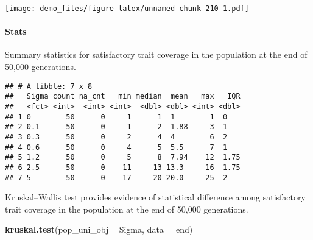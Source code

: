 \documentclass[]{book}
\newenvironment{Shaded}{\begin{snugshade}}{\end{snugshade}}
\newcommand{\DataTypeTok}[1]{\textcolor[rgb]{0.13,0.29,0.53}{#1}}
\newcommand{\KeywordTok}[1]{\textcolor[rgb]{0.13,0.29,0.53}{\textbf{#1}}}
\newcommand{\NormalTok}[1]{#1}
\newcommand{\OperatorTok}[1]{\textcolor[rgb]{0.81,0.36,0.00}{\textbf{#1}}}
\newcommand{\OtherTok}[1]{\textcolor[rgb]{0.56,0.35,0.01}{#1}}
\newcommand{\StringTok}[1]{\textcolor[rgb]{0.31,0.60,0.02}{#1}}
\let\oldparagraph\paragraph
\renewcommand{\paragraph}[1]{\oldparagraph{#1}\mbox{}}
\begin{document}
\texttt{[image: demo\_files/figure-latex/unnamed-chunk-210-1.pdf]}

\hypertarget{stats-40}{%
\paragraph{Stats}\label{stats-40}}

Summary statistics for satisfactory trait coverage in the population at the end of 50,000 generations.

\begin{Shaded}
\end{Shaded}

\begin{verbatim}
## # A tibble: 7 x 8
##   Sigma count na_cnt   min median  mean   max   IQR
##   <fct> <int>  <int> <int>  <dbl> <dbl> <int> <dbl>
## 1 0        50      0     1      1  1        1  0   
## 2 0.1      50      0     1      2  1.88     3  1   
## 3 0.3      50      0     2      4  4        6  2   
## 4 0.6      50      0     4      5  5.5      7  1   
## 5 1.2      50      0     5      8  7.94    12  1.75
## 6 2.5      50      0    11     13 13.3     16  1.75
## 7 5        50      0    17     20 20.0     25  2
\end{verbatim}

Kruskal--Wallis test provides evidence of statistical difference among satisfactory trait coverage in the population at the end of 50,000 generations.

\begin{Shaded}
\begin{Highlighting}[]
\KeywordTok{kruskal.test}\NormalTok{(pop_uni_obj }\OperatorTok{~}\StringTok{ }\NormalTok{Sigma, }\DataTypeTok{data =}\NormalTok{ end)}
\end{Highlighting}
\end{Shaded}
\end{document}
